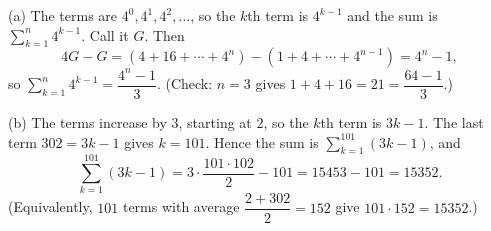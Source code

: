(a) The terms are $4^0,4^1,4^2,\dots$, so the $k$th term is $4^{k-1}$ and the sum is $\displaystyle\sum_{k=1}^{n}4^{k-1}$. Call it $G$. Then
\[
4G-G=(4+16+\cdots+4^{n})-(1+4+\cdots+4^{n-1})=4^n-1,
\]
so $\displaystyle\sum_{k=1}^{n}4^{k-1}=\boxed{\dfrac{4^n-1}{3}}$. (Check: $n=3$ gives $1+4+16=21=\dfrac{64-1}{3}$.)

(b) The terms increase by $3$, starting at $2$, so the $k$th term is $3k-1$. The last term $302=3k-1$ gives $k=101$. Hence the sum is $\displaystyle\sum_{k=1}^{101}(3k-1)$, and
\[
\sum_{k=1}^{101}(3k-1)=3\cdot\dfrac{101\cdot102}{2}-101=15453-101=\boxed{15352}.
\]
(Equivalently, $101$ terms with average $\dfrac{2+302}{2}=152$ give $101\cdot152=15352$.)
